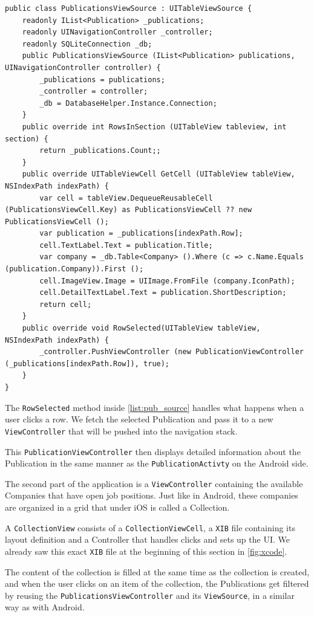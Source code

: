 \begin{lstlisting}[frame=lt,caption= PublicationsViewSource.cs, label={list:pub_source}]
public class PublicationsViewSource : UITableViewSource	{
	readonly IList<Publication> _publications; 
	readonly UINavigationController _controller;
	readonly SQLiteConnection _db;
	public PublicationsViewSource (IList<Publication> publications, UINavigationController controller) {
		_publications = publications;
		_controller = controller;
		_db = DatabaseHelper.Instance.Connection;
	}
	public override int RowsInSection (UITableView tableview, int section) {
		return _publications.Count;;
	}
	public override UITableViewCell GetCell (UITableView tableView, NSIndexPath indexPath) {
		var cell = tableView.DequeueReusableCell (PublicationsViewCell.Key) as PublicationsViewCell ?? new PublicationsViewCell ();
		var publication = _publications[indexPath.Row];
		cell.TextLabel.Text = publication.Title;
		var company = _db.Table<Company> ().Where (c => c.Name.Equals (publication.Company)).First ();
		cell.ImageView.Image = UIImage.FromFile (company.IconPath);
		cell.DetailTextLabel.Text = publication.ShortDescription;
		return cell;
	}
	public override void RowSelected(UITableView tableView, NSIndexPath indexPath) {
		_controller.PushViewController (new PublicationViewController (_publications[indexPath.Row]), true);
	}
}
\end{lstlisting}

The \texttt{RowSelected} method inside \autoref{list:pub_source} handles what happens when a user clicks a row. We fetch the selected Publication and pass it to a new \texttt{ViewController} that will be pushed into the navigation stack.

This \texttt{PublicationViewController} then displays detailed information about the Publication in the same manner as the \texttt{PublicationActivty} on the Android side.\newline

The second part of the application is a \texttt{ViewController} containing the available Companies that have open job positions. Just like in Android, these companies are organized in a grid that under iOS is called a Collection.

A \texttt{CollectionView} consists of a \texttt{CollectionViewCell}, a \texttt{XIB} file containing its layout definition and a Controller that handles clicks and sets up the \ac{UI}. We already saw this exact \texttt{XIB} file at the beginning of this section in \autoref{fig:xcode}.

The content of the collection is filled at the same time as the collection is created, and when the user clicks on an item of the collection, the Publications get filtered by reusing the \texttt{PublicationsViewController} and its \texttt{ViewSource}, in a similar way as with Android.
 

